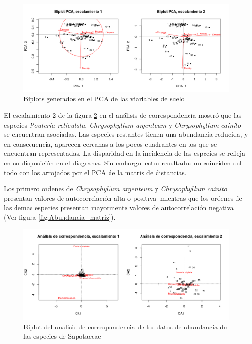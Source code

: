 \documentclass[11pt,]{article}
\begin{document}
\begin{figure}
\centering
\includegraphics[width=1.00000\textwidth]{PCA_comunidad_actualizado.png}
\caption{Biplots generados en el PCA de las viariables de suelo
\label{fig:PCA_comunidad}}
\end{figure}

El escalamiento 2 de la figura \ref{fig:Analisis_de_correspondencia} en
el análisis de correspondencia mostró que las especies \emph{Pouteria
reticulata}, \emph{Chrysophyllum argenteum} y \emph{Chrysophyllum
cainito} se encuentran asociadas. Las especies restantes tienen una
abundancia reducida, y en consecuencia, aparecen cercanas a los pocos
cuadrantes en los que se encuentran representadas. La disparidad en la
incidencia de las especies se refleja en su disposición en el diagrama.
Sin embargo, estos resultados no coinciden del todo con los arrojados
por el PCA de la matriz de distancias.

Los primero ordenes de \emph{Chrysophyllum argenteum} y
\emph{Chrysophyllum cainito} presentan valores de autocorrelación alta o
positiva, mientras que los ordenes de las demas especies presentan
mayormente valores de autocorrelación negativa (Ver figura
\ref{fig:Abundancia_matriz}).

\begin{figure}
\centering
\includegraphics[width=1.00000\textwidth]{analisis_de_correspondencia_actualizado.png}
\caption{Biplot del analisis de correspondencia de los datos de
abundancia de las especies de Sapotaceae
\label{fig:Analisis_de_correspondencia}}
\end{figure}
\end{document}
